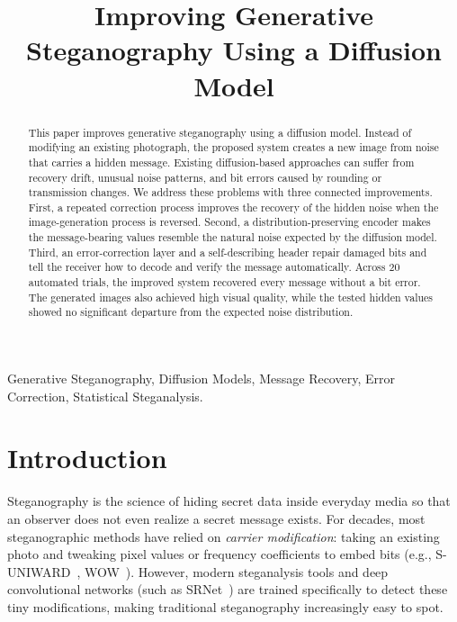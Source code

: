 \documentclass[conference]{IEEEtran}
\begin{document}
\title{Improving Generative Steganography Using a Diffusion Model}

\author{
\and
{}
\and
{}
}

\maketitle

\begin{abstract}
This paper improves generative steganography using a diffusion model. Instead of modifying an existing photograph, the proposed system creates a new image from noise that carries a hidden message. Existing diffusion-based approaches can suffer from recovery drift, unusual noise patterns, and bit errors caused by rounding or transmission changes. We address these problems with three connected improvements. First, a repeated correction process improves the recovery of the hidden noise when the image-generation process is reversed. Second, a distribution-preserving encoder makes the message-bearing values resemble the natural noise expected by the diffusion model. Third, an error-correction layer and a self-describing header repair damaged bits and tell the receiver how to decode and verify the message automatically. Across 20 automated trials, the improved system recovered every message without a bit error. The generated images also achieved high visual quality, while the tested hidden values showed no significant departure from the expected noise distribution.
\end{abstract}

\begin{IEEEkeywords}
Generative Steganography, Diffusion Models, Message Recovery, Error Correction, Statistical Steganalysis.
\end{IEEEkeywords}

\section{Introduction}
Steganography is the science of hiding secret data inside everyday media so that an observer does not even realize a secret message exists. For decades, most steganographic methods have relied on \textit{carrier modification}: taking an existing photo and tweaking pixel values or frequency coefficients to embed bits (e.g., S-UNIWARD~\cite{holub2014universal}, WOW~\cite{holub2012designing}). However, modern steganalysis tools and deep convolutional networks (such as SRNet~\cite{boroumand2018deep}) are trained specifically to detect these tiny modifications, making traditional steganography increasingly easy to spot.
\end{document}
